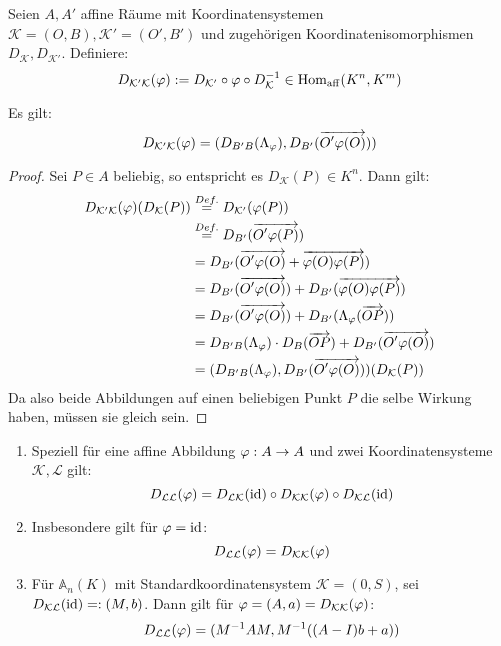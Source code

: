 \documentclass[parskip,a4paper,twoside,DIV15,BCOR12mm]{scrbook}
\begin{document}
\begin{definition}
Seien $A,A'$ affine Räume mit Koordinatensystemen $\mathcal{K}=(O,B),\mathcal{K'}=(O',B')$
und zugehörigen Koordinatenisomorphismen $D_{\mathcal{K}},D_{\mathcal{K'}}$. Definiere:
\[D_{\mathcal{K'K}}(\varphi):=D_{\mathcal{K'}}\circ \varphi\circ D_{\mathcal{K}}^{-1}\in\operatorname{Hom_{aff}}(K^n,K^m)\]
\end{definition}

\begin{lemma}
Es gilt:
\[D_{\mathcal{K'K}}(\varphi)=(D_{B'B}(\Lambda_\varphi),D_{B'}(\overrightarrow{O'\varphi(O)}))\]
\end{lemma}

\begin{proof}
Sei $P\in A$ beliebig, so entspricht es $D_\mathcal{K}(P)\in K^n$. Dann gilt:
\begin{align*}
D_{\mathcal{K'K}}(\varphi)(D_\mathcal{K}(P)) &\stackrel{Def.}{=} D_\mathcal{K'}(\varphi(P))\\
&\stackrel{Def.}{=} D_{B'}(\overrightarrow{O'\varphi(P)})\\
&= D_{B'}(\overrightarrow{O'\varphi(O)}+\overrightarrow{\varphi(O)\varphi(P)})\\
&= D_{B'}(\overrightarrow{O'\varphi(O)})+D_{B'}(\overrightarrow{\varphi(O)\varphi(P)})\\
&= D_{B'}(\overrightarrow{O'\varphi(O)})+D_{B'}(\Lambda_\varphi (\overrightarrow{OP}))\\
&= D_{B'B}(\Lambda_\varphi)\cdot D_B(\overrightarrow{OP})+D_{B'}(\overrightarrow{O'\varphi(O)})\\
&= (D_{B'B}(\Lambda_\varphi),D_{B'}(\overrightarrow{O'\varphi(O)}))(D_\mathcal{K}(P))
\end{align*}
Da also beide Abbildungen auf einen beliebigen Punkt $P$ die selbe Wirkung haben, 
müssen sie gleich sein.
\end{proof}

\begin{comment}
Das Zusammenfügen von kommutativen Diagrammen liefert für einen weiteren affinen Raum
$A''$ mit Koordinatensystem $\mathcal{K''}=(O'',B'')$ und einer affinen Abbildung $\Psi:
A'\to A''$:
\[D_{\mathcal{K''K}}(\psi\circ\vp)=D_{\mathcal{K''K'}}(\psi)\circ D_{\mathcal{K'K}}(\vp)\]
\end{comment}

\begin{corollary}
\begin{enumerate}
\item Speziell für eine affine Abbildung $\varphi:A\to A$ und zwei Koordinatensysteme
$\mathcal{K,L}$ gilt:
\[D_{\mathcal{LL}}(\varphi)=D_{\mathcal{LK}}(\operatorname{id})\circ D_{\mathcal{KK}}(\varphi)\circ D_{\mathcal{KL}}(\operatorname{id})\]
\item Insbesondere gilt für $\varphi=\operatorname{id}$:
\[D_{\mathcal{LL}}(\varphi)=D_{\mathcal{KK}}(\varphi)\]
\item Für $\mathbb{A}_n(K)$ mit Standardkoordinatensystem $\mathcal{K}=(0,S)$, sei
$D_{\mathcal{KL}}(\operatorname{id})=:(M,b)$. Dann gilt für $\varphi=(A,a)=D_{\mathcal{KK}}(\varphi)$:
\[D_{\mathcal{LL}}(\varphi)=(M^{-1}AM,M^{-1}((A-I)b+a))\]
\end{enumerate}
\end{corollary}
\end{document}
